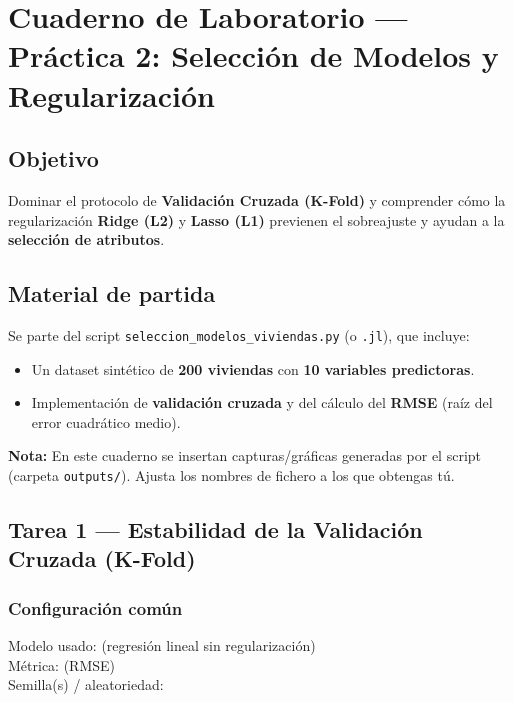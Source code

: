 \chapter{Cuaderno de Laboratorio — Práctica 2: Selección de Modelos y Regularización}

\section*{Objetivo}
Dominar el protocolo de \textbf{Validación Cruzada (K-Fold)} y comprender cómo la regularización
\textbf{Ridge (L2)} y \textbf{Lasso (L1)} previenen el sobreajuste y ayudan a la \textbf{selección de atributos}.

\section*{Material de partida}
Se parte del script \texttt{seleccion\_modelos\_viviendas.py} (o \texttt{.jl}), que incluye:
\begin{itemize}
    \item Un dataset sintético de \textbf{200 viviendas} con \textbf{10 variables predictoras}.
    \item Implementación de \textbf{validación cruzada} y del cálculo del \textbf{RMSE} (raíz del error cuadrático medio).
\end{itemize}

\vspace{0.4cm}
\noindent\textbf{Nota:} En este cuaderno se insertan capturas/gráficas generadas por el script (carpeta \texttt{outputs/}).
Ajusta los nombres de fichero a los que obtengas tú.

\section{Tarea 1 — Estabilidad de la Validación Cruzada (K-Fold)}

\subsection*{Configuración común}
Modelo usado: \underline{\hspace{6cm}} (regresión lineal sin regularización)\\
Métrica: \underline{\hspace{3cm}} (RMSE)\\
Semilla(s) / aleatoriedad: \underline{\hspace{6cm}}\\


